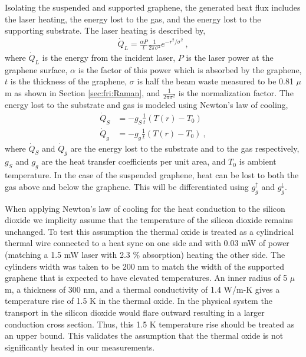 Isolating the suspended and supported graphene, the generated heat flux includes the laser heating, the energy lost to the gas, and the energy lost to the supporting substrate.
The laser heating is described by,
\begin{align}
	\dot{Q}_{L}=\frac{\alpha P}{t} \frac{1}{2 \pi \sigma^2} e^{-r^2/\sigma^2} \ ,
\end{align}
where $\dot{Q}_L$ is the energy from the incident laser, $P$ is the laser power at the graphene surface, $\alpha$ is the factor of this power which is absorbed by the graphene, $t$ is the thickness of the graphene, $\sigma$ is half the beam waste measured to be 0.81 $\mu$m as shown in Section \ref{sec:fri:Raman}, and $\frac{1}{2 \pi \sigma^2}$ is the normalization factor.
The energy lost to the substrate and gas is modeled using Newton's law of cooling,
\begin{align*}
	\dot{Q}_{S}&=-g_S \frac{1}{t} \left(T(r)-T_0 \right) \\
	\dot{Q}_{g}&=-g_g \frac{1}{t} \left(T(r)-T_0 \right) \ ,
\end{align*}
where $\dot{Q}_{S}$ and $\dot{Q}_g$ are the energy lost to the substrate and to the gas respectively, $g_S$ and $g_g$ are the heat transfer coefficients per unit area, and $T_0$ is ambient temperature.
In the case of the suspended graphene, heat can be lost to both the gas above and below the graphene.
This will be differentiated using $g_g^{\uparrow}$ and $g_g^{\downarrow}$.

When applying Newton's law of cooling for the heat conduction to the silicon dioxide we implicity assume that the temperature of the silicon dioxide remains unchanged.
To test this assumption the thermal oxide is treated as a cylindrical thermal wire connected to a heat sync on one side and with 0.03 mW of power (matching a 1.5 mW laser with 2.3 \% absorption) heating the other side.
The cylinders width was taken to be 200 nm to match the width of the supported graphene that is expected to have elevated temperatures.
An inner radius of 5 $\mu$m, a thickness of 300 nm, and a thermal conductivity of 1.4 W/m-K \cite{} gives a temperature rise of 1.5 K in the thermal oxide.
In the physical system the transport in the silicon dioxide would flare outward resulting in a larger conduction cross section.
Thus, this 1.5 K temperature rise should be treated as an upper bound.
This validates the assumption that the thermal oxide is not significantly heated in our measurements.


